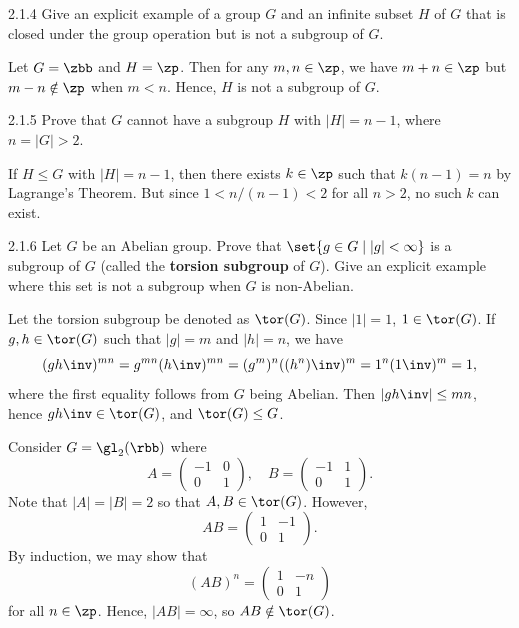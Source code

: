 \begin{exercise}{2.1.4}
    Give an explicit example of a group $G$ and an infinite subset $H$ of $G$ that is closed under the group operation but is not a subgroup of $G$.
\end{exercise}

\begin{sol}
    Let $G = \zbb$ and $H = \zp$.
	Then for any $m, n \in \zp$, we have $m + n \in \zp$ but $m - n \notin \zp$ when $m < n$.
	Hence, $H$ is not a subgroup of $G$.
\end{sol}

\begin{exercise}{2.1.5}
    Prove that $G$ cannot have a subgroup $H$ with $|H| = n - 1$, where $n = |G| > 2$.
\end{exercise}

\begin{sol}
   If $H \leq G$ with $|H| = n - 1$, then there exists $k \in \zp$ such that $k(n - 1) = n$ by Lagrange's Theorem.
   But since $1 < n/(n - 1) < 2$ for all $n > 2$, no such $k$ can exist.
\end{sol}

\begin{spex}{2.1.6}
    Let $G$ be an Abelian group.
	Prove that $\set{ g \in G \mid |g| < \infty }$ is a subgroup of $G$ (called the \textbf{torsion subgroup} of $G$).
	Give an explicit example where this set is not a subgroup when $G$ is non-Abelian.
\end{spex}

\begin{sol}[spsol]
    Let the torsion subgroup be denoted as $\tor(G)$.
	Since $|1| = 1$, $1 \in \tor(G)$.
	If $g, h \in \tor(G)$ such that $|g| = m$ and $|h| = n$, we have
    \[
    	(gh\inv)^{mn} = g^{mn}(h\inv)^{mn} = (g^m)^n((h^n)\inv)^m = 1^n(1\inv)^m = 1,
    \]
    where the first equality follows from $G$ being Abelian.
	Then $|gh\inv| \leq mn$, hence $gh\inv \in \tor(G)$, and $\tor(G) \leq G$.

    Consider $G = \gl_2(\rbb)$ where
    \[
    	A = 
        \begin{pmatrix}
            -1 & 0 \\
            0 & 1
        \end{pmatrix}, \quad
        B = 
        \begin{pmatrix}
            -1 & 1 \\
            0 & 1
        \end{pmatrix}.
	\]
    Note that $|A| = |B| = 2$ so that $A, B \in \tor(G)$.
	However,
    \[
    	AB = 
        \begin{pmatrix}
            1 & -1 \\
            0 & 1
        \end{pmatrix}.
	\]
    By induction, we may show that
    \[
    	(AB)^n = 
        \begin{pmatrix}
            1 & -n \\
            0 & 1
        \end{pmatrix}
	\]
    for all $n \in \zp$.
	Hence, $|AB| = \infty$, so $AB \notin \tor(G)$.
\end{sol}


